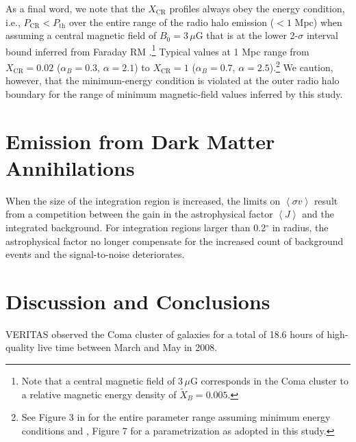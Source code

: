 \documentclass[12pt,manuscript]{aastex}
\newcommand{\expval}[1]{\left\langle #1 \right\rangle}
\newcommand{\CR}{\mathrm{CR}}
\begin{document}
As a final word, we note that the $X_{\CR}$ profiles always obey the energy condition, i.e., $P_{\CR} < P_{\mathrm{th}}$ over the entire range of the radio halo emission ($< 1$ Mpc) when assuming a central magnetic field of $B_{0}=3\,\mu$G that is at the lower 2-$\sigma$ interval bound inferred from Faraday RM \citep{article:Bonafede_etal:2010}.\footnote{Note that a central magnetic field of $3\,\mu$G corresponds in the Coma cluster to a relative magnetic energy density of $\tilde{X}_B=0.005$.} Typical values at 1 Mpc range from $X_{\CR} = 0.02$ ($\alpha_{B}=0.3$, $\alpha=2.1$) to $X_{\CR} = 1$ ($\alpha_{B}=0.7$, $\alpha=2.5$).\footnote{See Figure 3 in \citet{article:PfrommerEnsslin:2004a} for the entire parameter range assuming minimum energy conditions and \citet{article:PfrommerEnsslin:2004b}, Figure 7 for a parametrization as adopted in this study.} We caution, however, that the minimum-energy condition is violated at the outer radio halo boundary for the range of minimum
magnetic-field values inferred by this study.



\section{Emission from Dark Matter Annihilations}
When the size of the integration region is increased, the limits on $\expval{\sigma v}$ result from a competition between the gain in the astrophysical factor $\expval{J}$ and the integrated background. For integration regions larger than 0.2$^{\circ}$ in radius, the astrophysical factor no longer compensate for the increased count of background events and the signal-to-noise deteriorates. 

\section{Discussion and Conclusions}
VERITAS observed the Coma cluster of galaxies for a total of 18.6 hours of high-quality live time between March and May in 2008. 
\end{document}
